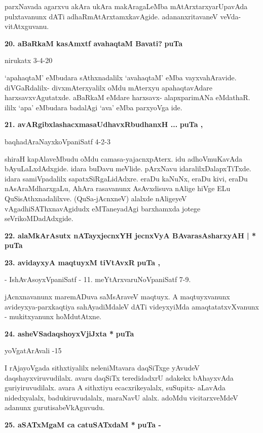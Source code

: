 \smallskip
parxNavada agarxvu akAra ukAra makAragaLeMba mAtArxtarxyarUpavAda pulxtavanunx dATi adhaRmAtArxtamxkavAgide. adananxritavaneV veVda-vitAtxguvanu.

\medskip
\noindent
\textbf{20. aBaRkaM kasAmxtf avahaqtaM Bavati?} \hfill{\bf puTa \pageref{224}}

\hfill{nirukatx 3-4-20}

\smallskip
`apahaqtaM' eMbudara sAthxnadalilx `avahaqtaM' eMba vayxvahAravide. diVGaRdalilx- divxmAterxyalilx oMdu mAterxyu apahaqtavAdare harxsavxvAgutatxde. aBaRkaM eMdare harxsavx- alapxparimANa eMdathaR. ililx `apa' eMbudara badalAgi `ava' eMba parxyoVga ide.

\medskip
\noindent
\textbf{21. avARgibxlashacxmasaUdhavxRbudhanxH ...} \hfill{\bf puTa \pageref{92b}, \pageref{152c}}

\hfill{baqhadAraNayxkoVpaniSatf 4-2-3}

\smallskip
shiraH kapAlaveMbudu oMdu camasa-yajacnxpAterx. idu adhoVmuKavAda bAyuLaLxdAdxgide. idara buDavu meVlide. pArxNavu idaralilxDalapxTiTxde. idara samiVpadalilx sapatxSiRgaLidAdxre. eraDu kaNuNx, eraDu kivi, eraDu nAsAraMdharxgaLu, AhAra rasavanunx AsAvxdisuva nAlige hiVge ELu QuSisAthxnadalilxve. (QuSa-jAcnxneV) alalxde nAligeyeV vAgadhiSAThxnavAgidudx eMTaneyadAgi barxhamxda jotege seVrikoMDadAdxgide.

\medskip
\noindent
\textbf{22. alaMkArAsutx nATayxjecnxYH jecnxVyA BAvarasAsharxyAH | *} \hfill{\bf puTa \pageref{245}}

\medskip
\noindent
\textbf{23. avidayxyA maqtuyxM tiVtAvxR} \hfill{\bf puTa \pageref{160c}, \pageref{161a}}

\smallskip
\hfill{- IshAvAsoyxVpaniSatf - 11. meYtArxvaruNoVpaniSatf 7-9.}

\smallskip
jAcnxnavanunx maremADuva saMsAraveV maqtuyx. A maqtuyxvanunx avideyxya-parxkaqtiya sahAyadiMdaleV dATi videyxyiMda amaqtatatxvXvanunx - mukitxyanunx hoMdutAtxne.

\medskip
\noindent
\textbf{24. asheVSadaqshoyxVjiJxta *} \hfill{\bf puTa \pageref{128b}}

\hfill{yoVgatArAvali -15}

\smallskip
I rAjayoVgada sithxtiyalilx neleniMtavara daqSiTxge yAvudeV daqshayxviruvudilalx. avaru daqSiTx teredidadxrU adakekx bAhayxvAda guriyiruvudilalx. avara A sithxtiyu ecacxrikeyalalx, suSupitx- aLavAda nidedxyalalx, badukiruvudalalx, maraNavU alalx. adoMdu vicitarxveMdeV adanunx gurutisabeVkAguvudu.

\medskip
\noindent
\textbf{25. aSATxMgaM ca catuSATxdaM *} \hfill{\bf puTa \pageref{84a}-\pageref{144a}}

